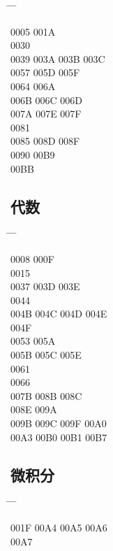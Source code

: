 \documentclass[twoside, twocolumn]{ctexart}
\newenvironment{problist}{
  \begin{center} \ttfamily \begin{tabbing}
      \hspace{50pt} \= \hspace{50pt} \= \hspace{50pt} \= \kill
  }{ \end{tabbing} \end{center} }
\begin{document}
  \begin{problist}
    0005   \> 001A \\ 0030    \\
    0039 \> 003A \> 003B \> 003C \\ 0057  \> 005D \> 005F \\
    0064   \> 006A \\ 006B \> 006C \> 006D  \\
    007A \> 007E \> 007F  \\ 0081    \\
    0085  \> 008D \> 008F \\ 0090   \> 00B9 \\
    00BB \\
  \end{problist}

  \subsection*{代数}

  \begin{problist}
    0008 \> 000F   \\ 0015    \\
    0037 \> 003D \> 003E  \\ 0044    \\
    004B \> 004C \> 004D \> 004E \\ 004F    \\
    0053   \> 005A \\ 005B \> 005C \> 005E  \\
    0061    \\ 0066    \\
    007B  \> 008B \> 008C \\ 008E   \> 009A \\
    009B \> 009C \> 009F \> 00A0 \\ 00A3 \> 00B0 \> 00B1 \> 00B7 \\
  \end{problist}

  \subsection*{微积分}

  \begin{problist}
    001F \> 00A4 \> 00A5 \> 00A6 \\ 00A7 \\
  \end{problist}
\end{document}
